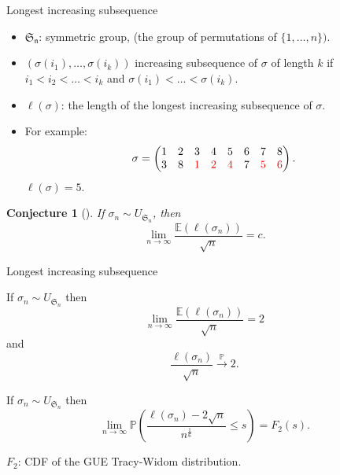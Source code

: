 \documentclass[english,xcolor=table]{beamer}
\newtheorem{conjecture}[theorem]{Conjecture}
\begin{document}
\begin{frame}{Longest increasing subsequence}
\begin{itemize}

\item $\mathfrak{S_n}$: symmetric group, (the  group of permutations of $\{1,\dots,n\}).$
\\ 
\item $(\sigma(i_1),\dots,\sigma(i_k))$  increasing  subsequence of $\sigma$ of length $k$ if $i_1<i_2<\dots<i_k$ and $\sigma(i_1)<\dots<\sigma(i_k)$.
\item $\ell(\sigma)$: the length of the longest increasing subsequence of $\sigma$.
\item For example: $$\sigma = \begin{pmatrix} 
1 & 2 & 3 & 4 & 5 & 6 & 7 & 8 \\
3 & 8 & \color{red} 1 &\color{red} 2 &\color{red} 4 & 7 &\color{red} 5 &\color{red} 6
  \end{pmatrix}.$$
$\ell(\sigma)=5$.
\end{itemize}
    \begin{conjecture}[\cite{ulam}]
    If $\sigma_n \sim {U}_{\mathfrak{S}_n}$, then
    $$\lim_{n\to \infty}\frac{\mathbb{E}(\ell(\sigma_n))}{\sqrt{n}}=c.$$ 
    \end{conjecture}
\end{frame}

\begin{frame}{Longest increasing subsequence}
\begin{theorem}
  If $\sigma_n \sim {U}_{\mathfrak{S}_n}$ then
    $$\lim_{n\to \infty}\frac{\mathbb{E}(\ell(\sigma_n))}{\sqrt{n}}=2$$
    and
    $$ \frac{\ell(\sigma_n)}{\sqrt{n}} \overset{\mathbb{P}}\to 2.$$ 
\end{theorem}
\begin{theorem}  \label{dbj}
 If $\sigma_n \sim {U}_{\mathfrak{S}_n}$ then
\begin{equation*} 
\lim_{n \to \infty} \mathbb{P}\left(\frac{\ell(\sigma_n)-2\sqrt{n}}{n^\frac 16}\leq s\right)=F_2(s).
\end{equation*}
\end{theorem}
    $F_2$: CDF of the GUE Tracy-Widom distribution. 
\end{frame}
\end{document}
